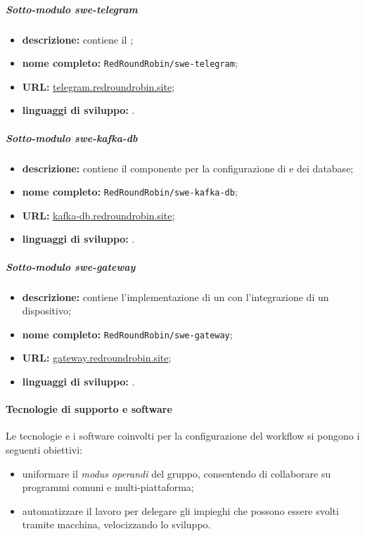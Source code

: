 		\subparagraph{Sotto-modulo swe-telegram}

		\begin{itemize}
		 	\item \textbf{descrizione:} contiene il ;
		 	\item \textbf{nome completo:} \verb!RedRoundRobin/swe-telegram!;
		 	\item \textbf{URL:} \href{https://github.com/RedRoundRobin/swe-telegram}{telegram.redroundrobin.site};
		 	\item \textbf{linguaggi di sviluppo:} .
		 \end{itemize}

		\subparagraph{Sotto-modulo swe-kafka-db}

		\begin{itemize}
		 	\item \textbf{descrizione:} contiene il componente per la configurazione di  e dei database;
		 	\item \textbf{nome completo:} \verb!RedRoundRobin/swe-kafka-db!;
		 	\item \textbf{URL:} \href{https://github.com/RedRoundRobin/swe-kafka-db}{kafka-db.redroundrobin.site};
		 	\item \textbf{linguaggi di sviluppo:} .
		 \end{itemize}

		 \subparagraph{Sotto-modulo swe-gateway}

		\begin{itemize}
		 	\item \textbf{descrizione:} contiene l'implementazione di un  con l'integrazione di un dispositivo;
		 	\item \textbf{nome completo:} \verb!RedRoundRobin/swe-gateway!;
		 	\item \textbf{URL:} \href{https://github.com/RedRoundRobin/swe-gateway}{gateway.redroundrobin.site};
		 	\item \textbf{linguaggi di sviluppo:} .
		 \end{itemize}


	\paragraph{Tecnologie di supporto e software}

	Le tecnologie e i software coinvolti per la configurazione del workflow si pongono i seguenti obiettivi:
	\begin{itemize}
		\item uniformare il \textit{modus operandi} del gruppo, consentendo di collaborare su programmi comuni e multi-piattaforma;
		\item automatizzare il lavoro per delegare gli impieghi che possono essere svolti tramite macchina, velocizzando lo sviluppo.
	\end{itemize}

